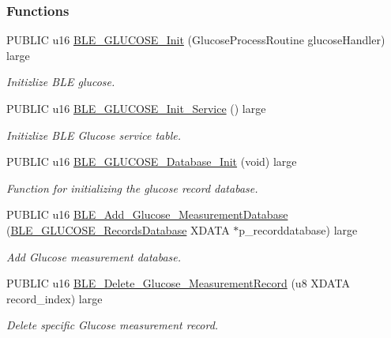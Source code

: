 \subsubsection*{Functions}
\begin{DoxyCompactItemize}
\item 
P\+U\+B\+L\+IC u16 \hyperlink{group___b_l_e___g_s_ga3ad5941d4be77b3f64af1ab1f24b4db4}{B\+L\+E\+\_\+\+G\+L\+U\+C\+O\+S\+E\+\_\+\+Init} (Glucose\+Process\+Routine glucose\+Handler) large
\begin{DoxyCompactList}\small\item\em Initizlize B\+LE glucose. \end{DoxyCompactList}\item 
P\+U\+B\+L\+IC u16 \hyperlink{group___b_l_e___g_s_ga54657aa8e37820087f7d2ee475c46d19}{B\+L\+E\+\_\+\+G\+L\+U\+C\+O\+S\+E\+\_\+\+Init\+\_\+\+Service} () large
\begin{DoxyCompactList}\small\item\em Initizlize B\+LE Glucose service table. \end{DoxyCompactList}\item 
P\+U\+B\+L\+IC u16 \hyperlink{group___b_l_e___g_s_ga46a7f8a9ba2550a8dc8e9b0d1ba7238e}{B\+L\+E\+\_\+\+G\+L\+U\+C\+O\+S\+E\+\_\+\+Database\+\_\+\+Init} (void) large
\begin{DoxyCompactList}\small\item\em Function for initializing the glucose record database. \end{DoxyCompactList}\item 
P\+U\+B\+L\+IC u16 \hyperlink{group___b_l_e___g_s_ga989e27895433c06328e836db741c33a6}{B\+L\+E\+\_\+\+Add\+\_\+\+Glucose\+\_\+\+Measurement\+Database} (\hyperlink{struct_b_l_e___g_l_u_c_o_s_e___records_database}{B\+L\+E\+\_\+\+G\+L\+U\+C\+O\+S\+E\+\_\+\+Records\+Database} X\+D\+A\+TA $\ast$p\+\_\+recorddatabase) large
\begin{DoxyCompactList}\small\item\em Add Glucose measurement database. \end{DoxyCompactList}\item 
P\+U\+B\+L\+IC u16 \hyperlink{group___b_l_e___g_s_gaf31acf015dbec6c950cd48ab1031946b}{B\+L\+E\+\_\+\+Delete\+\_\+\+Glucose\+\_\+\+Measurement\+Record} (u8 X\+D\+A\+TA record\+\_\+index) large
\begin{DoxyCompactList}\small\item\em Delete specific Glucose measurement record. \end{DoxyCompactList}\item 

\end{DoxyCompactItemize}
